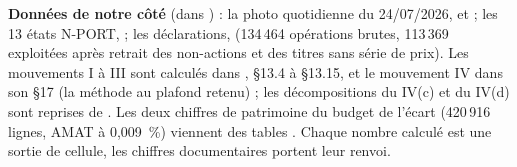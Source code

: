 \documentclass[9pt,a4paper]{extarticle}
\begin{document}
{\scriptsize\textbf{Données de notre côté} (dans ) : la photo quotidienne du 24/07/2026,  et  ; les 13 états N-PORT,  ; les déclarations,  (134\,464 opérations brutes, 113\,369 exploitées après retrait des non-actions et des titres sans série de prix). Les mouvements I à III sont calculés dans , \S13.4 à \S13.15, et le mouvement IV dans son \S17 (la méthode au plafond retenu) ; les décompositions du IV(c) et du IV(d) sont reprises de . Les deux chiffres de patrimoine du \og{}budget de l'écart\fg{} (420\,916 lignes, AMAT à 0,009~\%) viennent des tables . Chaque nombre calculé est une sortie de cellule, les chiffres documentaires portent leur renvoi.\par}
\end{document}
